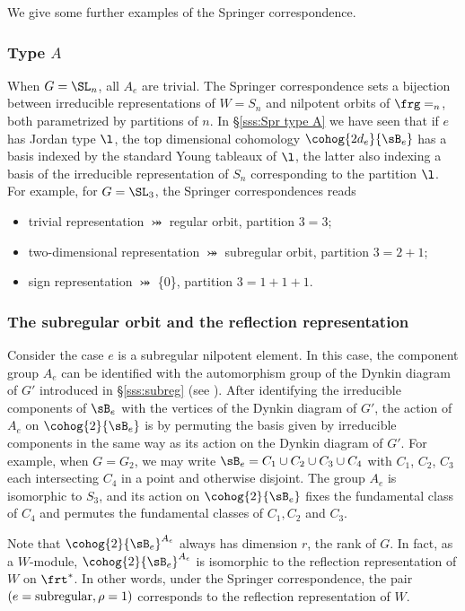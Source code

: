 We give some further examples of the Springer correspondence.



\subsubsection{Type $A$}\label{sss:A Spr corr} When $G=\SL_{n}$, all $A_{e}$ are trivial. The Springer correspondence sets a bijection between irreducible representations of $W=S_{n}$ and nilpotent orbits of $\frg=\sl_{n}$, both parametrized by partitions of $n$. In \S\ref{sss:Spr type A} we have seen that if $e$ has Jordan type $\l$, the top dimensional cohomology $\cohog{2d_{e}}{\sB_{e}}$ has a basis indexed by the standard Young tableaux of $\l$, the latter also indexing a basis of the irreducible representation of $S_{n}$ corresponding to the partition $\l$. For example, for $G=\SL_{3}$, the Springer correspondences reads
\begin{itemize}
\item trivial representation $\bij$ regular orbit, partition $3=3$;  
\item two-dimensional representation $\bij$ subregular orbit, partition $3=2+1$; 
\item sign representation $\bij$ \{0\}, partition $3=1+1+1$. 
\end{itemize}


\subsubsection{The subregular orbit and the reflection representation}\label{sss:subreg Spr corr} Consider the case $e$ is a subregular nilpotent element. In this case, the component group $A_{e}$ can be identified with the automorphism group of the Dynkin diagram of $G'$ introduced in \S\ref{sss:subreg} (see \cite[\S7.5, Proposition]{Slodowy}). After identifying the irreducible components of $\sB_{e}$ with the vertices of the Dynkin diagram of $G'$, the action of $A_{e}$ on $\cohog{2}{\sB_{e}}$ is by permuting the basis given by irreducible components in the same way as its action on the Dynkin diagram of $G'$. For example, when $G=G_{2}$,  we may write $\sB_{e}=C_{1}\cup C_{2}\cup C_{3}\cup C_{4}$ with $C_{1}$, $C_{2}$, $C_{3}$ each intersecting $C_{4}$ in a point and otherwise disjoint. The group $A_{e}$ is isomorphic to $S_{3}$, and its action on $\cohog{2}{\sB_{e}}$ fixes the fundamental class of $C_{4}$ and permutes the fundamental classes of $C_{1}, C_{2}$ and $C_{3}$.

Note that $\cohog{2}{\sB_{e}}^{A_{e}}$ always has dimension $r$, the rank of $G$. In fact, as a $W$-module, $\cohog{2}{\sB_{e}}^{A_{e}}$ is isomorphic to the reflection representation of $W$ on $\frt^{*}$. In other words, under the Springer correspondence, the pair $(e=\textup{subregular}, \rho=1)$ corresponds to the reflection representation of $W$.





